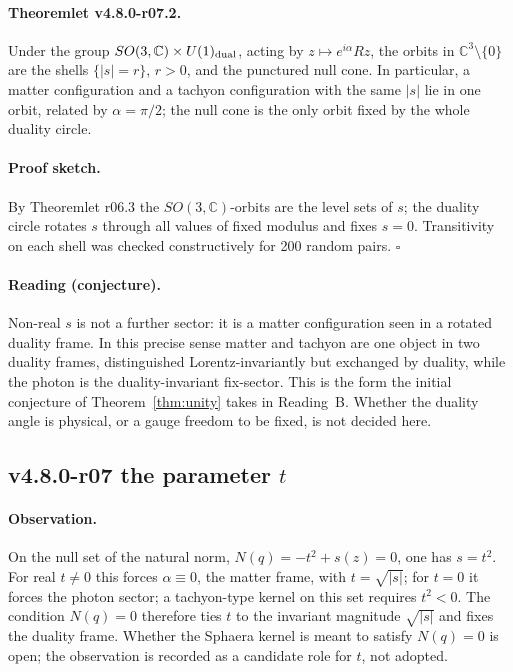 \paragraph{Theoremlet v4.8.0-r07.2.}
Under the group \(SO(3,\mathbb C)\times U(1)_{\rm dual}\), acting by \(z\mapsto e^{i\alpha}Rz\), the
orbits in \(\mathbb C^3\setminus\{0\}\) are the shells \(\{|s|=r\}\), \(r>0\), and the punctured null
cone.  In particular, a matter configuration and a tachyon configuration with the same \(|s|\) lie in
one orbit, related by \(\alpha=\pi/2\); the null cone is the only orbit fixed by the whole duality
circle.

\paragraph{Proof sketch.}
By Theoremlet r06.3 the \(SO(3,\mathbb C)\)-orbits are the level sets of \(s\); the duality circle
rotates \(s\) through all values of fixed modulus and fixes \(s=0\).  Transitivity on each shell was
checked constructively for 200 random pairs.  \(\square\)

\paragraph{Reading (conjecture).}
Non-real \(s\) is not a further sector: it is a matter configuration seen in a rotated duality frame.
In this precise sense matter and tachyon are one object in two duality frames, distinguished
Lorentz-invariantly but exchanged by duality, while the photon is the duality-invariant fix-sector.
This is the form the initial conjecture of Theorem~\ref{thm:unity} takes in Reading~B.  Whether the
duality angle is physical, or a gauge freedom to be fixed, is not decided here.

\subsection*{v4.8.0-r07 the parameter \texorpdfstring{$t$}{t}}
\label{subsec:v480-r07-parameter-t}

\paragraph{Observation.}
On the null set of the natural norm, \(N(q)=-t^2+s(z)=0\), one has \(s=t^2\).  For real
\(t\neq0\) this forces \(\alpha\equiv0\), the matter frame, with \(t=\sqrt{|s|}\); for \(t=0\) it forces
the photon sector; a tachyon-type kernel on this set requires \(t^2<0\).  The condition \(N(q)=0\)
therefore ties \(t\) to the invariant magnitude \(\sqrt{|s|}\) and fixes the duality frame.  Whether
the Sphaera kernel is meant to satisfy \(N(q)=0\) is open; the observation is recorded as a candidate
role for \(t\), not adopted.

